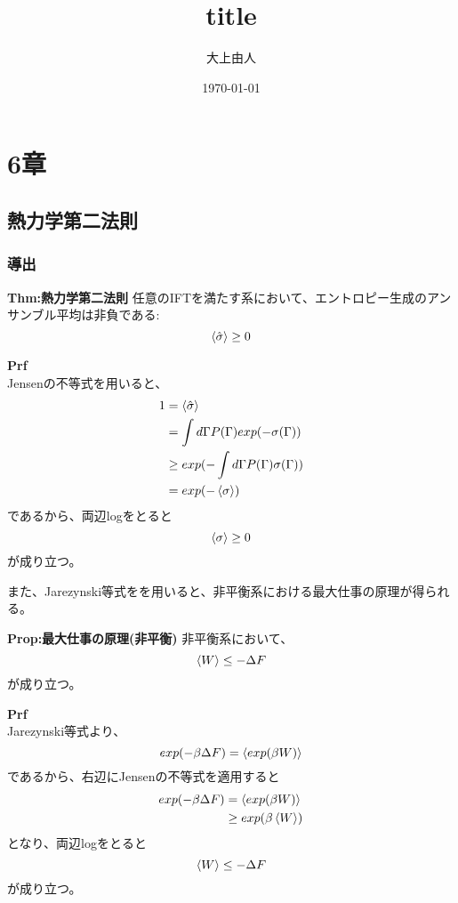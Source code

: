 \documentclass[a4paper,11pt]{jsarticle}
\begin{document}
\title{title}
\author{大上由人}
\date{\today}
\maketitle
\section*{6章}
\subsection[6.1]{熱力学第二法則}
\subsubsection[6.1.1]{導出}
\begin{itembox}[l]{\textbf{Thm:熱力学第二法則}}
    任意のIFTを満たす系において、エントロピー生成のアンサンブル平均は非負である:
    \begin{equation}
        \ev{\hat{\sigma}} \geq 0
    \end{equation}

\end{itembox}
\textbf{Prf}\\
Jensenの不等式を用いると、
\begin{align}
    1 &= \ev{\hat{\sigma}}\\
    &= \int d\Gamma P(\Gamma) exp(-\sigma(\Gamma))\\
    &\geq exp(-\int d\Gamma P(\Gamma)\sigma(\Gamma))\\
    &= exp(-\ev{\sigma})
\end{align}
であるから、両辺logをとると
\begin{equation}
    \ev{\sigma} \geq 0
\end{equation}
が成り立つ。\qedsymbol

また、Jarezynski等式をを用いると、非平衡系における最大仕事の原理が得られる。
\begin{itembox}[l]{\textbf{Prop:最大仕事の原理(非平衡)}}
    非平衡系において、
    \begin{equation}
        \ev{W} \leq -\Delta F
    \end{equation}
    が成り立つ。
\end{itembox}
\textbf{Prf}\\
Jarezynski等式より、
\begin{equation}
    exp(-\beta \Delta F) = \ev{exp(\beta W)}
\end{equation}
であるから、右辺にJensenの不等式を適用すると
\begin{align}
    exp(-\beta \Delta F) &= \ev{exp(\beta W)}\\
    &\geq exp(\beta \ev{W})
\end{align}
となり、両辺logをとると
\begin{equation}
    \ev{W} \leq -\Delta F
\end{equation}
が成り立つ。\qedsymbol
\end{document}
